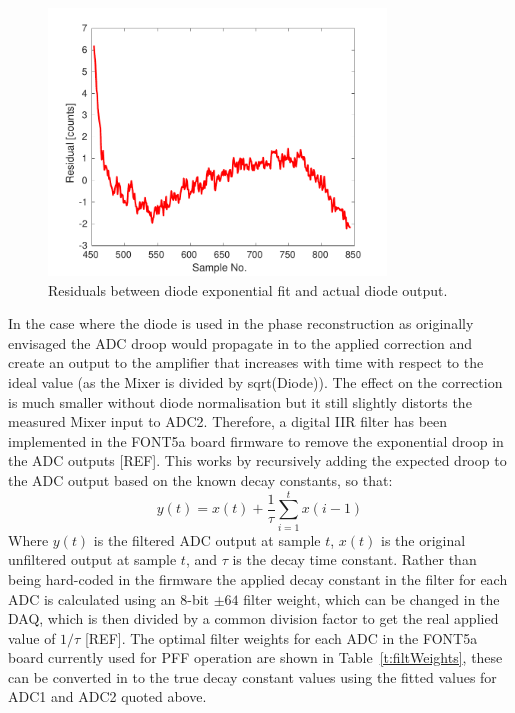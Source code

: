 \begin{figure}
  \centering
  \includegraphics[width=0.8\textwidth]{Figures/commissioning/iirDiodeFitResid}
  \caption{Residuals between diode exponential fit and actual diode output.}
  \label{f:iirDiodeFitResid}
\end{figure}

In the case where the diode is used in the phase reconstruction as originally envisaged the ADC droop would propagate in to the applied correction and create an output to the amplifier that increases with time with respect to the ideal value (as the Mixer is divided by sqrt(Diode)). The effect on the correction is much smaller without diode normalisation but it still slightly distorts the measured Mixer input to ADC2. Therefore, a digital IIR filter has been implemented in the FONT5a board firmware to remove the exponential droop in the ADC outputs [REF]. This works by recursively adding the expected droop to the ADC output based on the known decay constants, so that:
\begin{equation}
y(t) = x(t) + \frac{1}{\tau} \sum_{i=1}^{t} x(i-1)
\end{equation}
\label{e:iirFilt}
Where \(y(t)\) is the filtered ADC output at sample \(t\), \(x(t)\) is the original unfiltered output at sample \(t\), and \(\tau\) is the decay time constant. Rather than being hard-coded in the firmware the applied decay constant in the filter for each ADC is calculated using an 8-bit \(\pm64\) filter weight, which can be changed in the DAQ, which is then divided by a common division factor to get the real applied value of \(1/\tau\) [REF]. The optimal filter weights for each ADC in the FONT5a board currently used for PFF operation are shown in Table~\ref{t:filtWeights}, these can be converted in to the true decay constant values using the fitted values for ADC1 and ADC2 quoted above.

